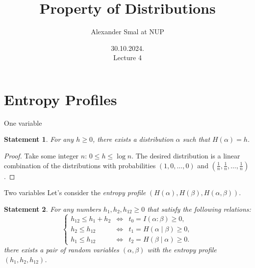 \documentclass[handout,aspectratio=169]{beamer}
\title{Property of Distributions}
\author{Alexander Smal at NUP}
\date{30.10.2024.\\ Lecture 4}
\newtheorem{statement}{Statement}
\begin{document}
    \begin{frame}[plain]
        \maketitle
    \end{frame}

    \section{Entropy Profiles}
    \begin{frame}{One variable}
		\begin{statement}
		    For any \(h \ge 0\), there exists a distribution \(\alpha\) such that \(H(\alpha) = h\).
		\end{statement}
		\pause
		\begin{proof}
		    Take some integer \(n\): \(0 \le h \le \log n\). The desired distribution is a linear combination of the distributions with probabilities \((1, 0, \dotsc, 0)\) and \((\frac{1}{n}, \frac{1}{n}, \dotsc, \frac{1}{n})\).
		\end{proof}
    \end{frame}

    \begin{frame}{Two variables}
		Let's consider the \emph{entropy profile} \((H(\alpha), H(\beta), H(\alpha, \beta))\).
		\begin{statement}
		    For any numbers \(h_1, h_2, h_{12} \ge 0\) that satisfy the following relations:
		\[
		    \left\{
		    \begin{array}{lll}
		        h_{12} \le h_1 + h_2 & \iff & t_0 = I(\alpha:\beta) \ge 0,\\
		        h_{2} \le h_{12}     & \iff & t_1 = H(\alpha \mid \beta) \ge 0,\\
		        h_{1} \le h_{12}     & \iff & t_2 = H(\beta \mid \alpha) \ge 0.
		    \end{array}
		    \right.
		\]
		    there exists a pair of random variables \((\alpha, \beta)\) with the entropy profile \((h_1, h_2, h_{12})\).
		\end{statement}
    \end{frame}
\end{document}
